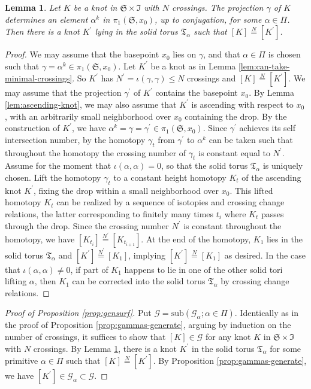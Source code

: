 \documentclass[12pt,
	]{amsart}
\newtheorem{lemma}[theorem]{Lemma}
\theoremstyle{definition}
\newcommand{\mrm}[1]{\mathrm{#1}}
\newcommand{\mcal}[1]{\mathcal{#1}}
\newcommand{\mfrak}[1]{\mathfrak{#1}}
\newcommand{\lp}{\left(}\newcommand{\rp}{\right)}
\newcommand{\sub}[1]{\mrm{sub}\lp#1\rp}
\newcommand{\class}[1]{\left[#1\right]}
\newcommand{\surf}{\mfrak{S}}
\newcommand{\intt}{\mfrak{I}}
\newcommand{\gen}{\mcal{G}}
\newcommand{\indeq}{\overset{N}{=}}
\newcommand{\altindeq}{\overset{N^\prime}{=}}
\newcommand{\tor}{\mfrak{T}}
\begin{document}
\begin{lemma}\label{lem:isotopy-in-3-manifold}
Let $K$ be a knot in $\surf\times\intt$ with $N$ crossings.  The projection $\gamma$ of $K$ determines an element $\alpha^k$ in $\pi_1(\surf,x_0)$, up to conjugation, for some $\alpha\in\Pi$.  Then there is a knot $K^\prime$ lying in the solid torus $\tor_\alpha$ such that $\class{K}\indeq\class{K^\prime}$.  
\end{lemma}

\begin{proof}
We may assume that the basepoint $x_0$ lies on $\gamma$, and that $\alpha\in\Pi$ is chosen such that $\gamma=\alpha^k\in\pi_1(\surf,x_0)$.  Let $K^\prime$ be a knot as in Lemma \ref{lem:can-take-minimal-crossings}.  So $K^\prime$ has $N^\prime=\iota(\gamma,\gamma)\leq N$ crossings and $\class{K}\indeq\class{K^\prime}$.  We may assume that the projection $\gamma^\prime$ of $K^\prime$ contains the basepoint $x_0$.  By Lemma \ref{lem:ascending-knot}, we may also assume that $K^\prime$ is ascending with respect to $x_0$, with an arbitrarily small neighborhood over $x_0$ containing the drop.  By the construction of $K^\prime$, we have $\alpha^k=\gamma=\gamma^\prime\in\pi_1(\surf,x_0)$.  Since $\gamma^\prime$ achieves its self intersection number, by \cite{hassMR1216633} the homotopy $\gamma_t$ from $\gamma^\prime$ to $\alpha^k$ can be taken such that throughout the homotopy the crossing number of $\gamma_t$ is constant equal to $N^\prime$.  Assume for the moment that $\iota(\alpha,\alpha)=0$, so that the solid torus $\tor_\alpha$ is uniquely chosen.  Lift the homotopy $\gamma_t$ to a constant height homotopy $K_t$ of the ascending knot $K^\prime$, fixing the drop within a small neighborhood over $x_0$.  This lifted homotopy $K_t$ can be realized by a sequence of isotopies and crossing change relations, the latter corresponding to finitely many times $t_i$ where $K_t$ passes through the drop.  Since the crossing number $N^\prime$ is constant throughout the homotopy, we have $\class{K_{t_i}}\altindeq\class{K_{t_{i+1}}}$.  At the end of the homotopy, $K_1$ lies in the solid torus $\tor_\alpha$ and $\class{K^\prime}\altindeq\class{K_1}$, implying $\class{K^\prime}\indeq\class{K_1}$ as desired.  In the case that $\iota(\alpha,\alpha)\neq0$, if part of $K_1$ happens to lie in one of the other solid tori lifting $\alpha$, then $K_1$ can be corrected into the solid torus $\tor_\alpha$ by crossing change relations.  
\end{proof}

\begin{proof}[Proof of Proposition {\upshape\ref{prop:gensurf}}]
Put $\gen=\sub{\gen_\alpha;\alpha\in\Pi}$.  Identically as in the proof of Proposition \ref{prop:gammas-generate}, arguing by induction on the number of crossings, it suffices to show that $\class{K}\in\gen$ for any knot $K$ in $\surf\times\intt$ with $N$ crossings.  By Lemma \ref{lem:isotopy-in-3-manifold}, there is a knot $K^\prime$ in the solid torus $\tor_\alpha$ for some primitive $\alpha\in\Pi$ such that $\class{K}\indeq\class{K^\prime}$.  By Proposition \ref{prop:gammas-generate}, we have $\class{K^\prime}\in\gen_\alpha\subset\gen$.
\end{proof}
\end{document}
